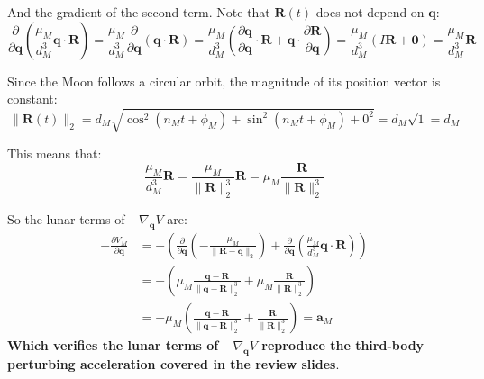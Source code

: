 \documentclass[titlepage]{article}
\begin{document}
And the gradient of the second term. Note that $\boldsymbol{R}(t)$ does not depend on $\boldsymbol{q}$:
\begin{equation}
	\frac{\partial}{\partial\boldsymbol{q}}\left(\frac{\mu_M}{d_M^3}\boldsymbol{q}\cdot\boldsymbol{R}\right)=\frac{\mu_M}{d_M^3}\frac{\partial}{\partial\boldsymbol{q}}\left(\boldsymbol{q}\cdot\boldsymbol{R}\right)=\frac{\mu_M}{d_M^3}\left(\frac{\partial\boldsymbol{q}}{\partial\boldsymbol{q}}\cdot\boldsymbol{R}+\boldsymbol{q}\cdot\frac{\partial\boldsymbol{R}}{\partial\boldsymbol{q}}\right)=\frac{\mu_M}{d_M^3}\left(I\boldsymbol{R}+\boldsymbol{0}\right)=\frac{\mu_M}{d_M^3}\boldsymbol{R}
\end{equation}

Since the Moon follows a circular orbit, the magnitude of its position vector is constant:
\begin{equation}
	\|\boldsymbol{R}(t)\|_2=d_M\sqrt{\cos^2(n_Mt+\phi_M)+\sin^2(n_Mt+\phi_M)+0^2}=d_M\sqrt{1}=d_M
\end{equation}

This means that:
\begin{equation}
	\frac{\mu_M}{d_M^3}\boldsymbol{R}=\frac{\mu_M}{\|\boldsymbol{R}\|_2^3}\boldsymbol{R}=\mu_M\frac{\boldsymbol{R}}{\|\boldsymbol{R}\|_2^3}
\end{equation}

\newpage

\begin{mdframed}[linewidth=1pt, innertopmargin=10pt, innerbottommargin=10pt]
	So the lunar terms of $-\nabla_{\boldsymbol{q}}V$ are:
	\begin{equation}
		\begin{split}
			-\frac{\partial V_M}{\partial\boldsymbol{q}}&=-\left(\frac{\partial}{\partial\boldsymbol{q}}\left(-\frac{\mu_M}{\|\boldsymbol{R}-\boldsymbol{q}\|_2}\right)+\frac{\partial}{\partial\boldsymbol{q}}\left(\frac{\mu_M}{d_M^3}\boldsymbol{q}\cdot\boldsymbol{R}\right)\right) \\
			&=-\left(\mu_M\frac{\boldsymbol{q}-\boldsymbol{R}}{\|\boldsymbol{q}-\boldsymbol{R}\|_2^3}+\mu_M\frac{\boldsymbol{R}}{\|\boldsymbol{R}\|_2^3}\right) \\
			&=-\mu_M\left(\frac{\boldsymbol{q}-\boldsymbol{R}}{\|\boldsymbol{q}-\boldsymbol{R}\|_2^3}+\frac{\boldsymbol{R}}{\|\boldsymbol{R}\|_2^3}\right)=\boldsymbol{a}_M
		\end{split}
	\end{equation}
	\textbf{Which verifies the lunar terms of $-\nabla_{\boldsymbol{q}}V$ reproduce the third-body perturbing acceleration covered in the review slides}.
\end{mdframed}
\end{document}
